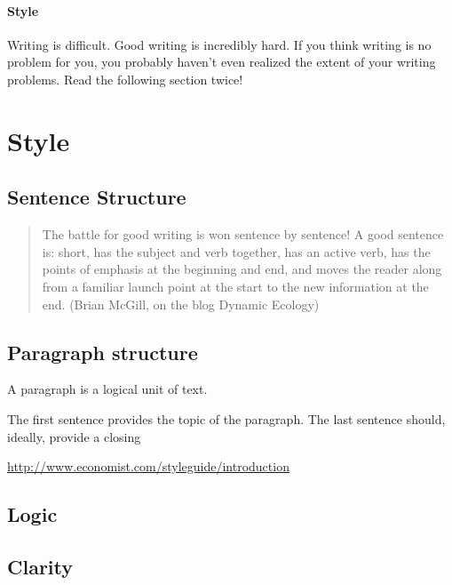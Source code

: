 \documentclass{tufte-book}
\begin{document}
\paragraph{Style} Writing is difficult. Good writing is incredibly hard. If you think writing is no problem for you, you probably haven't even realized the extent of your writing problems. Read the following section twice!


\section{Style}


\subsection{Sentence Structure}

\begin{quote}
The battle for good writing is won sentence by sentence! A good sentence is: short, has the subject and verb together, has an active verb, has the points of emphasis at the beginning and end, and moves the reader along from a familiar launch point at the start to the new information at the end. (Brian McGill, on the blog Dynamic Ecology)
\end{quote}



\subsection{Paragraph structure}

A paragraph is a logical unit of text. 

The first sentence provides the topic of the paragraph. The last sentence should, ideally, provide a closing 



\href{http://www.economist.com/styleguide/introduction}{http://www.economist.com/styleguide/introduction}




\subsection{Logic}


\subsection{Clarity}
\end{document}
